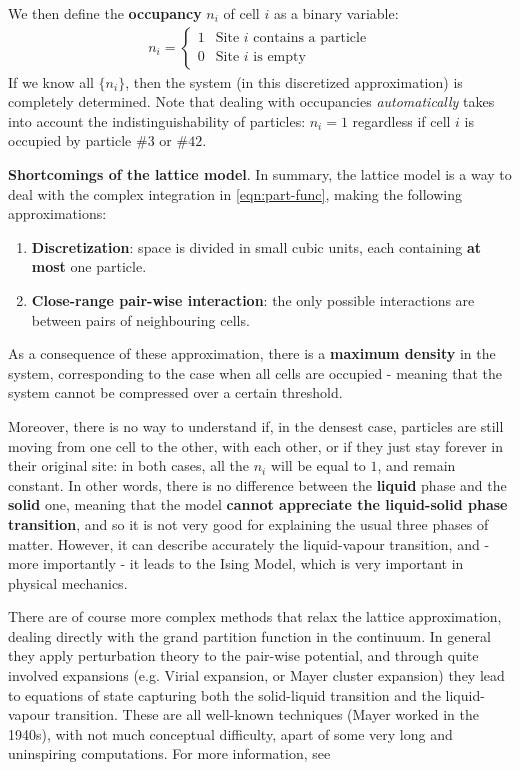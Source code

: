 \documentclass[../template.tex]{subfiles}
\begin{document}
We then define the \textbf{occupancy} $n_i$ of cell $i$ as a binary variable:
\begin{align*}
    n_i = \begin{cases}
        1 & \text{Site $i$ contains a particle}\\
        0 & \text{Site $i$ is empty}
    \end{cases}
\end{align*} 
If we know all $\{n_i\}$, then the system (in this discretized approximation) is completely determined. Note that dealing with occupancies \textit{automatically} takes into account the indistinguishability of particles: $n_i = 1$ regardless if cell $i$ is occupied by particle $\#3$ or $\#42$.

\begin{appr}
    \textbf{Shortcomings of the lattice model}. In summary, the lattice model is a way to deal with the complex integration in \ref{eqn:part-func}, making the following approximations:
    \begin{enumerate}
        \item \textbf{Discretization}: space is divided in small cubic units, each containing \textbf{at most} one particle. 
        \item \textbf{Close-range pair-wise interaction}: the only possible interactions are between pairs of neighbouring cells.
    \end{enumerate}
    As a consequence of these approximation, there is a \textbf{maximum density} in the system, corresponding to the case when all cells are occupied - meaning that the system cannot be compressed over a certain threshold.
    
    Moreover, there is no way to understand if, in the densest case, particles are still moving from one cell to the other,  with each other, or if they just stay forever in their original site: in both cases, all the $n_i$ will be equal to $1$, and remain constant. In other words, there is no difference between the \textbf{liquid} phase and the \textbf{solid} one, meaning that the model \textbf{cannot appreciate the liquid-solid phase transition}, and so it is not very good for explaining the usual three phases of matter. However, it can describe accurately the liquid-vapour transition, and - more importantly - it leads to the Ising Model, which is very important in physical mechanics.

    \medskip

    There are of course more complex methods that relax the lattice approximation, dealing directly with the grand partition function in the continuum. In general they apply perturbation theory to the pair-wise potential, and through quite involved expansions (e.g. Virial expansion, or Mayer cluster expansion) they lead to equations of state capturing both the solid-liquid transition and the liquid-vapour transition. These are all well-known techniques (Mayer worked in the 1940s), with not much conceptual difficulty, apart of some very long and uninspiring computations. For more information, see %
\end{appr}
\end{document}
